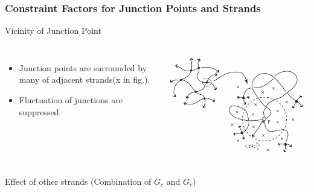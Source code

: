 \documentclass[12pt, dvipdfmx]{beamer}
\begin{document}
\begin{frame}
	\frametitle{Constraint Factors for Junction Points and Strands}
		\vspace{-2mm}
		\begin{alertblock}{Vicinity of Junction Point}
			\begin{columns}[totalwidth=1\textwidth]
				\vspace{-3mm}
				\begin{itemize}
					\item Junction points are surrounded by many of \alert{adjacent strands(x in fig.).}
					\item Fluctuation of junctions are \alert{suppressed}. 
				\end{itemize}
				\centering
				\includegraphics[width=\textwidth]{JP_vicinity.png}
			\end{columns}
		\end{alertblock}
		\vspace{-1mm}
		\begin{block}{Effect of other strands (Combination of $G_c$ and $G_e$)}
\end{block}
\end{frame}
\end{document}
